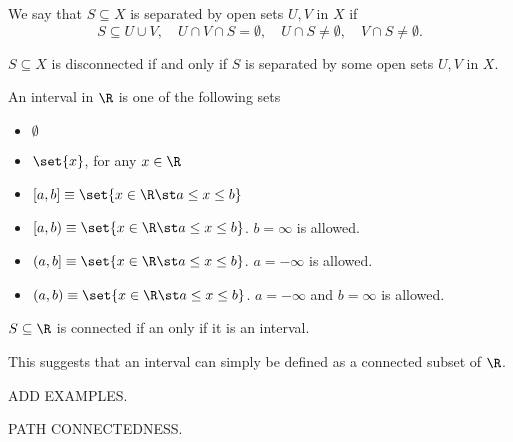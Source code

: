 \begin{ndfn}
  We say that $S \subseteq X$ is separated by open sets $U, V$ in $X$ if
  \begin{equation*}
    S \subseteq U \cup V,
    \quad U \cap V \cap S = \emptyset,
    \quad U \cap S \neq \emptyset,
    \quad V \cap S \neq \emptyset.
  \end{equation*}
\end{ndfn}

\begin{nprop}
  $S \subseteq X$ is disconnected if and only if $S$ is separated by some open sets $U, V$ in $X$.
\end{nprop}

An interval in $\R$ is one of the following sets
\begin{itemize}
\item $\emptyset$
\item $\set{x}$, for any $x \in \R$
\item $[a,b] \equiv \set{x \in \R \st a \leq x \leq b}$
\item $[a,b) \equiv \set{x \in \R \st a \leq x \leq b}$. $b=\infty$ is allowed.
\item $(a,b] \equiv \set{x \in \R \st a \leq x \leq b}$. $a=-\infty$ is allowed.
\item $(a,b) \equiv \set{x \in \R \st a \leq x \leq b}$. $a=-\infty$ and $b=\infty$ is allowed.
\end{itemize}

\begin{nlemma}
  $S \subseteq \R$ is connected if an only if it is an interval.
\end{nlemma}
This suggests that an interval can simply be defined as a connected subset of $\R$.

ADD EXAMPLES.

PATH CONNECTEDNESS.